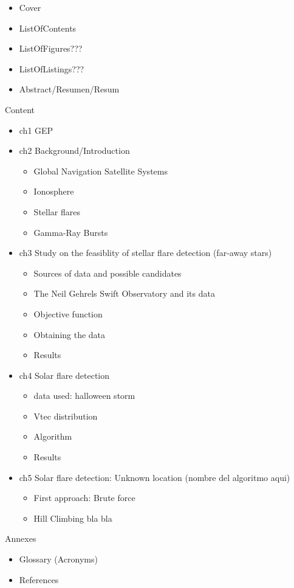 \begin{itemize}
	\item Cover
	\item ListOfContents
	\item ListOfFigures???
	\item ListOfListings???
	\item Abstract/Resumen/Resum
\end{itemize} 

Content

\begin{itemize}
	\item ch1 GEP
	\item ch2 Background/Introduction
	\begin{itemize}
		\item Global Navigation Satellite Systems
		\item Ionosphere
		\item Stellar flares
		\item  Gamma-Ray Bursts
	\end{itemize}
	\item ch3 Study on the feasiblity of stellar flare detection (far-away stars)
	\begin{itemize}
		\item Sources of data and possible candidates
		\item The Neil Gehrels Swift Observatory and its data 
		\item Objective function
		\item Obtaining the data
		\item Results
	\end{itemize}
	\item ch4 Solar flare detection
	\begin{itemize}
		\item data used: halloween storm
		\item Vtec distribution
		\item Algorithm
		\item Results
	\end{itemize}
	\item ch5 Solar flare detection: Unknown location (nombre del algoritmo aqui)
	\begin{itemize}
		\item First approach: Brute force
		\item Hill Climbing bla bla
	\end{itemize}
\end{itemize}

Annexes

\begin{itemize}
	\item Glossary (Acronyms)
	\item References
\end{itemize}



